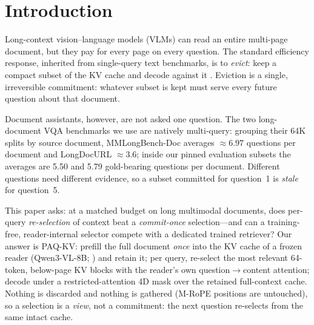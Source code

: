 \documentclass[letterpaper]{article} %
\newcommand{\paqc}{\textsc{PAQ-KV}}
\begin{document}
\section{Introduction}\label{sec:intro}

Long-context vision--language models (VLMs) can read an entire multi-page document, but they pay for every page on every question. The standard efficiency response, inherited from single-query text benchmarks, is to \emph{evict}: keep a compact subset of the KV cache and decode against it \citep{li2024snapkv,zhang2023h2o,chen2024fastv,wan2024lookm,kim2025kvzip}. Eviction is a single, irreversible commitment: whatever subset is kept must serve every future question about that document.

Document assistants, however, are not asked one question. The two long-document VQA benchmarks we use are natively multi-query: grouping their 64K splits by source document, MMLongBench-Doc \citep{ma2024mmlongbench} averages ${\approx}6.97$ questions per document and LongDocURL \citep{deng2025longdocurl} ${\approx}3.6$; inside our pinned evaluation subsets the averages are 5.50 and 5.79 gold-bearing questions per document. Different questions need different evidence, so a subset committed for question~1 is \emph{stale} for question~5.

This paper asks: at a matched budget on long multimodal documents, does per-query \emph{re-selection} of context beat a \emph{commit-once} selection---and can a training-free, reader-internal selector compete with a dedicated trained retriever? Our answer is \paqc{}: prefill the full document \emph{once} into the KV cache of a frozen reader (Qwen3-VL-8B; \citealp{qwen3vl2025}) and retain it; per query, re-select the most relevant 64-token, below-page KV blocks with the reader's own question$\to$content attention; decode under a restricted-attention 4D mask over the retained full-context cache. Nothing is discarded and nothing is gathered (M-RoPE positions are untouched), so a selection is a \emph{view}, not a commitment: the next question re-selects from the same intact cache.
\end{document}
